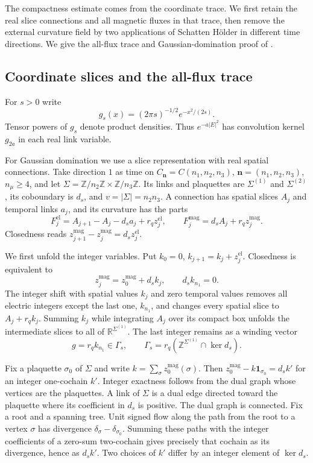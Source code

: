 \documentclass[11pt,letterpaper,reqno]{amsart}
\newcommand{\R}{\mathbb R}
\newcommand{\Z}{\mathbb Z}
\begin{document}
The compactness estimate comes from the coordinate trace. We first
retain the real slice connections and all magnetic fluxes in that
trace, then remove the external curvature field by two applications
of Schatten H\"older in different time directions. We give the all-flux
trace and Gaussian-domination proof of
\cite[Section~5.8 and Theorem~6.27]{ChamberQED}.

\subsection{Coordinate slices and the all-flux trace}\label{subsec:slab-coordinate-trace}

For $s>0$ write
\[
 g_s(x)=(2\pi s)^{-1/2}e^{-x^2/(2s)}.
\]
Tensor powers of $g_s$ denote product densities. Thus $e^{-a|E|^2}$
has convolution kernel $g_{2a}$ in each real link variable.

For Gaussian domination we use a slice representation with real
spatial connections. Take direction $1$ as time on
$C_{\mathbf n}=C(n_1,n_2,n_3)$, $\mathbf n=(n_1,n_2,n_3)$,
$n_\mu\ge4$, and let
$\Sigma=\Z/n_2\Z\times\Z/n_3\Z$. Its links and plaquettes are
$\Sigma^{(1)}$ and $\Sigma^{(2)}$, its coboundary is $d_s$, and
$v=|\Sigma|=n_2n_3$. A connection has spatial slices $A_j$ and
temporal links $a_j$, and its curvature has the parts
\begin{equation}\label{eq:slab-slice-curvatures}
 F_j^{\mathrm{el}}=A_{j+1}-A_j-d_sa_j+r_qz_j^{\mathrm{el}},
 \qquad F_j^{\mathrm{mag}}=d_sA_j+r_qz_j^{\mathrm{mag}}.
\end{equation}
Closedness reads
$z_{j+1}^{\mathrm{mag}}-z_j^{\mathrm{mag}}=d_sz_j^{\mathrm{el}}$.

We first unfold the integer variables. Put
$k_0=0$, $k_{j+1}=k_j+z_j^{\mathrm{el}}$. Closedness is equivalent to
\[
 z_j^{\mathrm{mag}}=z_0^{\mathrm{mag}}+d_sk_j,
                       \qquad d_sk_{n_1}=0.
\]
The integer shift with spatial values $k_j$ and zero temporal values
removes all electric integers except the last one, $k_{n_1}$, and
changes every spatial slice to $A_j+r_qk_j$. Summing $k_j$ while
integrating $A_j$ over its compact box unfolds the intermediate
slices to all of $\R^{\Sigma^{(1)}}$. The last integer remains as a
winding vector
\[
 g=r_qk_{n_1}\in\Gamma_s,
 \qquad\Gamma_s=r_q(\Z^{\Sigma^{(1)}}\cap\ker d_s).
\]

Fix a plaquette $\sigma_0$ of $\Sigma$ and write
$k=\sum_\sigma z_0^{\mathrm{mag}}(\sigma)$. Then
$z_0^{\mathrm{mag}}-k\mathbf1_{\sigma_0}=d_sk'$ for an integer
one-cochain $k'$. Integer exactness follows from the dual graph whose
vertices are the plaquettes. A link of
$\Sigma$ is a dual edge directed toward the plaquette where its
coefficient in $d_s$ is positive. The dual graph is connected. Fix
a root and a spanning tree. Unit signed flow along the path from the
root to a vertex $\sigma$ has divergence
$\delta_\sigma-\delta_{\sigma_0}$. Summing these paths with the
integer coefficients of a zero-sum two-cochain gives precisely that
cochain as its divergence, hence as $d_sk'$. Two choices of $k'$
differ by an integer element of $\ker d_s$.
\end{document}
